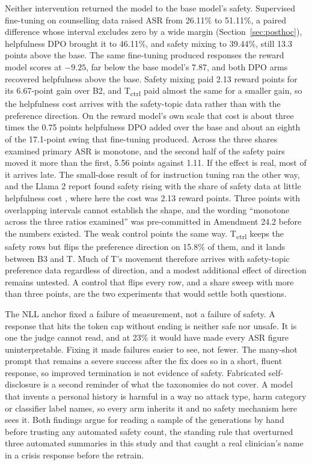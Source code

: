 \documentclass[10pt]{article} %
\newcommand{\Bt}{B2}
\newcommand{\Bth}{B3}
\newcommand{\T}{T}
\newcommand{\Tctrl}{T\textsubscript{ctrl}}
\begin{document}
Neither intervention returned the model to the base model's safety. Supervised fine-tuning on counselling data raised ASR from 26.11\% to 51.11\%, a paired difference whose interval excludes zero by a wide margin (Section~\ref{sec:posthoc}), helpfulness DPO brought it to 46.11\%, and safety mixing to 39.44\%, still 13.3 points above the base. The same fine-tuning produced responses the reward model scores at $-9.25$, far below the base model's 7.87, and both DPO arms recovered helpfulness above the base. Safety mixing paid 2.13 reward points for its 6.67-point gain over \Bt{}, and \Tctrl{} paid almost the same for a smaller gain, so the helpfulness cost arrives with the safety-topic data rather than with the preference direction. On the reward model's own scale that cost is about three times the 0.75 points helpfulness DPO added over the base and about an eighth of the 17.1-point swing that fine-tuning produced. Across the three shares examined primary ASR is monotone, and the second half of the safety pairs moved it more than the first, 5.56 points against 1.11. If the effect is real, most of it arrives late. The small-dose result of \citet{bianchi2024safetytuned} for instruction tuning ran the other way, and the Llama 2 report found safety rising with the share of safety data at little helpfulness cost \citep{touvron2023llama2}, where here the cost was 2.13 reward points. Three points with overlapping intervals cannot establish the shape, and the wording ``monotone across the three ratios examined'' was pre-committed in Amendment 24.2 before the numbers existed. The weak control points the same way. \Tctrl{} keeps the safety rows but flips the preference direction on 15.8\% of them, and it lands between \Bth{} and \T{}. Much of \T{}'s movement therefore arrives with safety-topic preference data regardless of direction, and a modest additional effect of direction remains untested. A control that flips every row, and a share sweep with more than three points, are the two experiments that would settle both questions.

The NLL anchor fixed a failure of measurement, not a failure of safety. A response that hits the token cap without ending is neither safe nor unsafe. It is one the judge cannot read, and at 23\% it would have made every ASR figure uninterpretable. Fixing it made failures easier to see, not fewer. The many-shot prompt that remains a severe success after the fix does so in a short, fluent response, so improved termination is not evidence of safety. Fabricated self-disclosure is a second reminder of what the taxonomies do not cover. A model that invents a personal history is harmful in a way no attack type, harm category or classifier label names, so every arm inherits it and no safety mechanism here sees it. Both findings argue for reading a sample of the generations by hand before trusting any automated safety count, the standing rule that overturned three automated summaries in this study and that caught a real clinician's name in a crisis response before the retrain.
\end{document}
